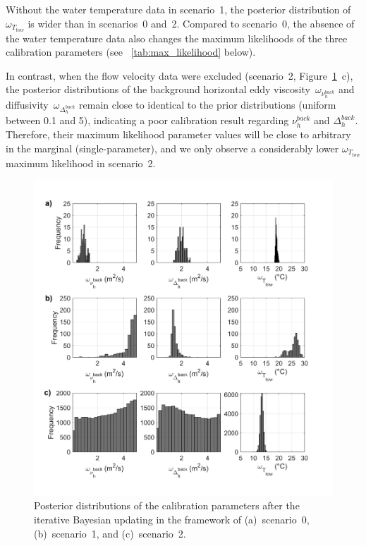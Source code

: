 \documentclass[draft,linenumbers,onecolumn]{agujournal2019} %
\begin{document}
Without the water temperature data in scenario~1, the posterior distribution of \(\omega_{T_{tow}}\) is wider than in scenarios~0 and~2. Compared to scenario~0, the absence of the water temperature data also changes the maximum likelihoods of the three calibration parameters (see \tablename{~\ref{tab:max_likelihood}} below). 

In contrast, when the flow velocity data were excluded (scenario~2, Figure~\ref{fig03:posteriors}~c), the posterior distributions of the background horizontal eddy viscosity~\(\omega_{\nu_{h}^{back}}\) and diffusivity~\(\omega_{\Delta_{h}^{back}}\) remain close to identical to the prior distributions (uniform between 0.1 and 5), indicating a poor calibration result regarding $\nu_{h}^{back}$ and $\Delta_{h}^{back}$. Therefore, their maximum likelihood parameter values will be close to arbitrary in the marginal (single-parameter), and we only observe a considerably lower \(\omega_{T_{tow}}\) maximum likelihood in scenario~2.

\begin{figure}
	\centering
	\includegraphics[width=14.5cm]{posterior_distributions.png}
	\caption{Posterior distributions of the calibration parameters after the iterative Bayesian updating in the framework of (a)~scenario~0, (b)~scenario~1, and (c)~scenario~2.}
	\label{fig03:posteriors}
\end{figure}
\end{document}
